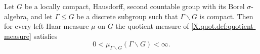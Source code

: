 Let $G$ be a locally compact, Hausdorff, second countable group with its Borel $\sigma$-algebra, and let $\Gamma\le G$ be a
discrete subgroup such that $\Gamma\backslash G$ is compact. Then for every left Haar measure $\mu$ on $G$ the quotient
measure of \cref{X.quot.def:quotient-measure} satisfies
\[
  0<\mu_{\Gamma\backslash G}(\Gamma\backslash G)<\infty.
\]
